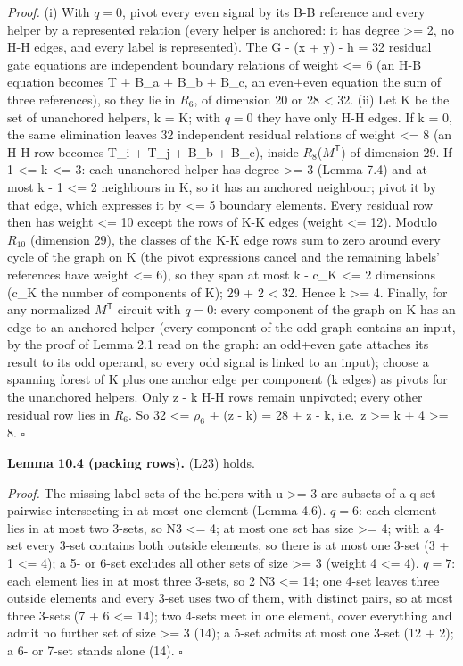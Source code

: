 \emph{Proof.} (i) With \(q=0\), pivot every even signal by its B-B reference and every helper by a represented relation (every helper is anchored: it has degree \textgreater= 2, no H-H edges, and every label is represented). The G - (x + y) - h = 32 residual gate equations are independent boundary relations of weight \textless= 6 (an H-B equation becomes T + B\_a + B\_b + B\_c, an even+even equation the sum of three references), so they lie in \(R_6\), of dimension 20 or 28 \textless{} 32. (ii) Let K be the set of unanchored helpers, k = \textbar K\textbar; with \(q=0\) they have only H-H edges. If k = 0, the same elimination leaves 32 independent residual relations of weight \textless= 8 (an H-H row becomes T\_i + T\_j + B\_b + B\_c), inside \(R_8\)(\(M^{\mathsf T}\)) of dimension 29. If 1 \textless= k \textless= 3: each unanchored helper has degree \textgreater= 3 (Lemma 7.4) and at most k - 1 \textless= 2 neighbours in K, so it has an anchored neighbour; pivot it by that edge, which expresses it by \textless= 5 boundary elements. Every residual row then has weight \textless= 10 except the rows of K-K edges (weight \textless= 12). Modulo \(R_{10}\) (dimension 29), the classes of the K-K edge rows sum to zero around every cycle of the graph on K (the pivot expressions cancel and the remaining labels' references have weight \textless= 6), so they span at most k - c\_K \textless= 2 dimensions (c\_K the number of components of K); 29 + 2 \textless{} 32. Hence k \textgreater= 4. Finally, for any normalized \(M^{\mathsf T}\) circuit with \(q=0\): every component of the graph on K has an edge to an anchored helper (every component of the odd graph contains an input, by the proof of Lemma 2.1 read on the graph: an odd+even gate attaches its result to its odd operand, so every odd signal is linked to an input); choose a spanning forest of K plus one anchor edge per component (k edges) as pivots for the unanchored helpers. Only z - k H-H rows remain unpivoted; every other residual row lies in \(R_6\). So 32 \textless= \(\rho_6\) + (z - k) = 28 + z - k, i.e.~z \textgreater= k + 4 \textgreater= 8. \(\square\)

\textbf{Lemma 10.4 (packing rows).} (L23) holds.

\emph{Proof.} The missing-label sets of the helpers with u \textgreater= 3 are subsets of a q-set pairwise intersecting in at most one element (Lemma 4.6). \(q=6\): each element lies in at most two 3-sets, so N3 \textless= 4; at most one set has size \textgreater= 4; with a 4-set every 3-set contains both outside elements, so there is at most one 3-set (3 + 1 \textless= 4); a 5- or 6-set excludes all other sets of size \textgreater= 3 (weight 4 \textless= 4). \(q=7\): each element lies in at most three 3-sets, so 2 N3 \textless= 14; one 4-set leaves three outside elements and every 3-set uses two of them, with distinct pairs, so at most three 3-sets (7 + 6 \textless= 14); two 4-sets meet in one element, cover everything and admit no further set of size \textgreater= 3 (14); a 5-set admits at most one 3-set (12 + 2); a 6- or 7-set stands alone (14). \(\square\)

